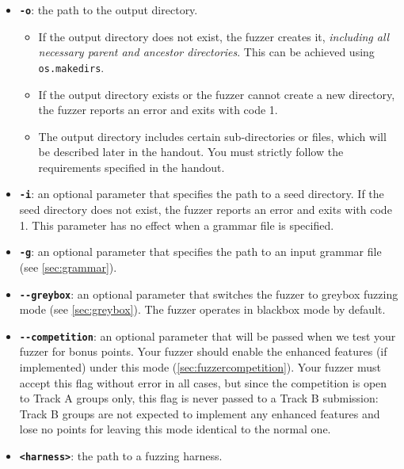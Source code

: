 \documentclass[letterpaper,11pt]{article}
\begin{document}
\begin{itemize}
    \item \textbf{\texttt{-o}}: the path to the output directory.
    \begin{itemize}
        \item If the output directory does not exist, the fuzzer creates it, \textit{including all necessary parent and ancestor directories}. This can be achieved using \texttt{os.makedirs}.
        \item If the output directory exists or the fuzzer cannot create a new directory, the fuzzer reports an error and exits with code 1.
        \item The output directory includes certain sub-directories or files, which will be described later in the handout. You must strictly follow the requirements specified in the handout.
    \end{itemize}
    \item \textbf{\texttt{-i}}: an optional parameter that specifies the path to a seed directory. If the seed directory does not exist, the fuzzer reports an error and exits with code 1. This parameter has no effect when a grammar file is specified.
    \item \textbf{\texttt{-g}}: an optional parameter that specifies the path to an input grammar file (see \autoref{sec:grammar}).
    \item \textbf{\texttt{{-}{-}greybox}}: an optional parameter that switches the fuzzer to greybox fuzzing mode (see \autoref{sec:greybox}). The fuzzer operates in blackbox mode by default.
    \item \textbf{\texttt{{-}{-}competition}}: an optional parameter that will be passed when we test your fuzzer for bonus points. Your fuzzer should enable the enhanced features (if implemented) under this mode (\autoref{sec:fuzzercompetition}). Your fuzzer must accept this flag without error in all cases, but since the competition is open to Track A groups only, this flag is never passed to a Track B submission: Track B groups are not expected to implement any enhanced features and lose no points for leaving this mode identical to the normal one.
    \item \textbf{\texttt{<harness>}}: the path to a fuzzing harness.
\end{itemize}
\end{document}
